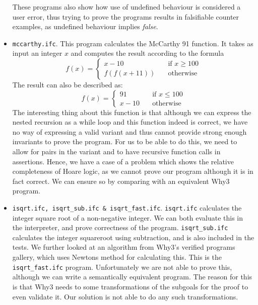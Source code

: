 \begin{itemize}
	These programs also show how use of undefined behaviour is considered a user error, thus trying to prove the programs results in falsifiable counter examples, as undefined behaviour implies \textit{false}.

  \item{\texttt{mccarthy.ifc}.}
   This program calculates the McCarthy 91 function. It takes as input an integer $x$ and computes the result according to the formula
	\[ f(x) =
	  \begin{cases}
	    x - 10       & \quad \text{if } x \ge 100 \\
	    f(f(x + 11))  & \quad \text{otherwise}
	  \end{cases}
  \]
  The result can also be described as:
	\[ f(x) =
	  \begin{cases}
	    91       & \quad \text{if } x \leq 100 \\
	    x - 10   & \quad \text{otherwise}
	  \end{cases}
	\]
  The interesting thing about this function is that although we can express the nested recursion as a while loop and this function indeed is correct, we have no way of expressing a valid variant and thus cannot provide strong enough invariants to prove the program.
        For us to be able to do this, we need to allow for pairs in the variant and to have recursive function calls in assertions.
        Hence, we have a case of a problem which shows the relative completeness of Hoare logic, as we cannot prove our program although it is in fact correct. We can ensure so by comparing with an equivalent Why3 program.
  \item{\texttt{isqrt.ifc, isqrt\_sub.ifc \& isqrt\_fast.ifc}.}
        \texttt{isqrt.ifc} calculates the integer square root of a non-negative integer. We can both evaluate this in the interpreter, and prove correctness of the program.
        \texttt{isqrt\_sub.ifc} calculates the integer squareroot using subtraction, and is also included in the tests.
        We further looked at an algorithm from Why3's verified programs gallery, which uses Newtons method for calculating this. This is the \texttt{isqrt\_fast.ifc} program.
        Unfortunately we are not able to prove this, although we can write a semantically equivalent program. The reason for this is that Why3 needs to some transformations of the subgoals for the proof to even validate it. Our solution is not able to do any such transformations.
\end{itemize}

